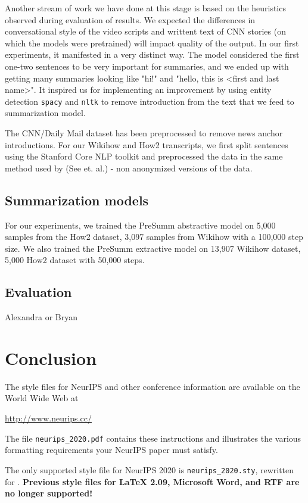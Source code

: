 \documentclass{article}
\begin{document}
Another stream of work we have done at this stage is based on the heuristics observed during evaluation of results. We expected the differences in conversational style of the video scripts and writtent text of CNN stories (on which the models were pretrained) will impact quality of the output. In our first experiments, it manifested in a very distinct way. The model considered the first one-two sentences to be very important for summaries, and we ended up with getting many summaries looking like "hi!" and "hello, this is <first and last name>". It inspired us for implementing an improvement by using entity detection   \verb+spacy+ and \verb+nltk+ to remove introduction from the text that we feed to summarization model.  

The CNN/Daily Mail dataset has been preprocessed to remove news anchor introductions. For our Wikihow and How2 transcripts, we first split sentences using the Stanford Core NLP toolkit and preprocessed the data in the same method used by (See et. al.) - non anonymized versions of the data.  


\subsection{Summarization models}
For our experiments, we trained the PreSumm abstractive model on 5,000 samples from the How2 dataset, 3,097 samples from Wikihow with a 100,000 step size. 
We also trained the PreSumm extractive model on 13,907 Wikihow dataset, 5,000 How2 dataset with 50,000 steps.


\subsection{Evaluation}
Alexandra or Bryan

\section{Conclusion}

The style files for NeurIPS and other conference information are available on
the World Wide Web at
\begin{center}
  \url{http://www.neurips.cc/}
\end{center}
The file \verb+neurips_2020.pdf+ contains these instructions and illustrates the
various formatting requirements your NeurIPS paper must satisfy.

The only supported style file for NeurIPS 2020 is \verb+neurips_2020.sty+,
rewritten for \LaTeXe{}.  \textbf{Previous style files for \LaTeX{} 2.09,
  Microsoft Word, and RTF are no longer supported!}
\end{document}
